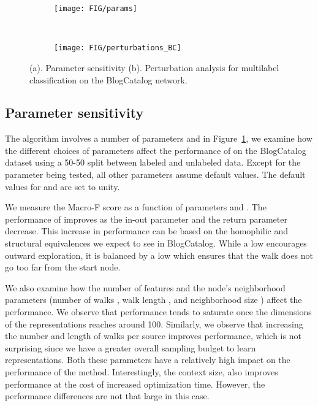\begin{figure*}[t]
\centering
\begin{subfigure}[b]{0.70\textwidth}
\texttt{[image: FIG/params]}
\caption{}\label{fig:mlc_params}
\end{subfigure} 
~
\begin{subfigure}[b]{0.28\textwidth}
\texttt{[image: FIG/perturbations\_BC]}
\caption{}\label{fig:mlc_perturb}
\end{subfigure}
\vspace{-0.2cm}
\caption{(a). Parameter sensitivity (b). Perturbation analysis for multilabel classification on the BlogCatalog network.}
\vspace{-0.4cm}
\end{figure*}

\subsection{Parameter sensitivity} 

The \nodevec algorithm involves a number of parameters and in Figure~\ref{fig:mlc_params}, we examine how the different choices of parameters affect the performance of \nodevec on the BlogCatalog dataset using a 50-50 split between labeled and unlabeled data. Except for the parameter being tested, all other parameters assume default values. The default values for  and  are set to unity.

We measure the Macro-F score as a function of parameters  and . The performance of \nodevec improves as the in-out parameter  and the return parameter  decrease. This increase in performance can be based on the homophilic and structural equivalences we expect to see in BlogCatalog. While a low  encourages outward exploration, it is balanced by a low  which ensures that the walk does not go too far from the start node.

We also examine how the number of features  and the node's neighborhood parameters (number of walks , walk length , and neighborhood size ) affect the performance. We observe that performance tends to saturate once the dimensions of the representations reaches around 100.
Similarly, we observe that increasing the number and length of walks per source improves performance, which is not surprising since we have a greater overall sampling budget  to learn representations. Both these parameters have a relatively high impact on the performance of the method. Interestingly, the context size,  also improves performance at the cost of increased optimization time. However, the performance differences are not that large in this case.

